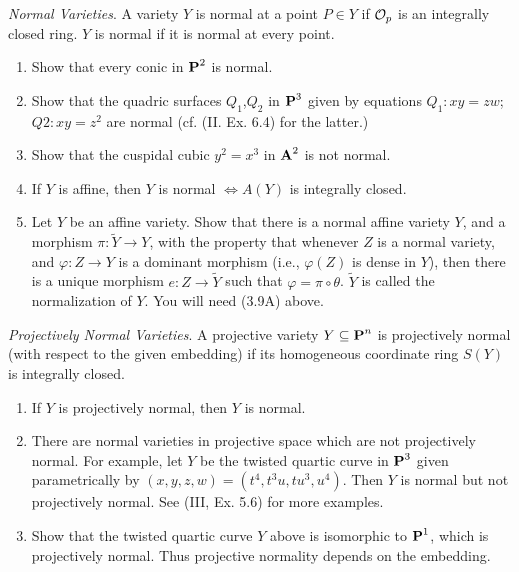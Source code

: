 \documentclass[10pt]{amsart}
\begin{document}
\begin{exercise}[3.17]
    \emph{Normal Varieties}. A variety $Y$ is normal at a point $P \in Y$ if $\cO_p$ is an integrally closed ring. 
    $Y$ is normal if it is normal at every point.
    \begin{enumerate}[itemsep=1pt]
        \item Show that every conic in $\pp^2$ is normal.
        \item Show that the quadric surfaces $Q_1$,$Q_2$ in $\pp^3$ given by equations $Q_1 :xy = zw$;
        $Q2 :xy = z^2$ are normal (cf. (II. Ex. 6.4) for the latter.)
        \item Show that the cuspidal cubic $y^2 = x^3$ in $\aa^2$ is not normal.
        \item If $Y$ is affine, then $Y$ is normal $\iff A(Y)$ is integrally closed.
        \item Let $Y$ be an affine variety. Show that there is a normal affine variety $Y$, and a
        morphism $\pi: \tilde{Y} \to Y$, with the property that whenever $Z$ is a normal variety, and 
        $\varphi : Z \to Y$ is a dominant morphism (i.e., $\varphi(Z)$ is dense in $Y$), then there is a unique 
        morphism $e:Z \to \tilde{Y}$ such that $\varphi = \pi \circ \theta$. $\tilde{Y}$ is called the 
        normalization of $Y$. You will need (3.9A) above.
    \end{enumerate}
\end{exercise}

\begin{exercise}[3.18]
    \emph{Projectively Normal Varieties}. A projective variety $Y \subseteq \pp^n$ is projectively normal 
    (with respect to the given embedding) if its homogeneous coordinate ring $S(Y)$ is integrally closed.
    \begin{enumerate}[itemsep=1pt]
        \item If $Y$ is projectively normal, then $Y$ is normal.
        \item There are normal varieties in projective space which are not projectively normal. For example, let $Y$ be the 
        twisted quartic curve in $\pp^3$ given parametrically by $(x,y,z,w) = (t^4 ,t^3u,tu^3,u^4)$. Then $Y$ is normal 
        but not projectively normal. See (III, Ex. 5.6) for more examples.
        \item Show that the twisted quartic curve $Y$ above is isomorphic to $\pp^1$, which is projectively normal. 
        Thus projective normality depends on the embedding.
    \end{enumerate}
\end{exercise}
\end{document}
